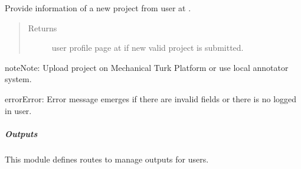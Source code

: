 \documentclass[a4paper,12pt,english]{sphinxmanual}
\begin{document}
\begin{fulllineitems}
\label{\detokenize{project_rst/user_rst/routes:project.user.inputs.upload_project}}
Provide information of a new project from user at .
\begin{quote}\begin{description}
\item[{Returns}] \leavevmode
user profile page at  if new valid project is submitted.

\end{description}\end{quote}

\begin{sphinxadmonition}{note}{Note:}
Upload project on Mechanical Turk Platform or use local annotator system.
\end{sphinxadmonition}

\begin{sphinxadmonition}{error}{Error:}
Error message emerges if there are invalid fields or there is no logged in user.
\end{sphinxadmonition}

\end{fulllineitems}

\label{\detokenize{project_rst/user_rst/routes:module-project.user.outputs}}

\subparagraph{Outputs}
\label{\detokenize{project_rst/user_rst/routes:outputs}}
 

This module defines routes to manage outputs for users.
\end{document}
